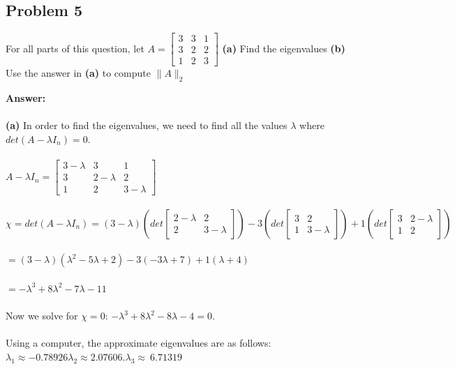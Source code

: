 \documentclass[12pt]{article}
\begin{document}
\newpage
\subsection*{Problem 5} For all parts of this question, let $A=\left[\begin{array}{lll}{3} & {3} & {1} \\ {3} & {2} & {2} \\ {1} & {2} & {3}\end{array}\right]$ \textbf{(a)} Find the eigenvalues \textbf{(b)} Use the answer in \textbf{(a)} to compute $\|A\|_2$

\bigskip
\noindent\textbf{Answer:}
\\~\\\textbf{(a)} In order to find the eigenvalues, we need to find all the values $\lambda$ where $det(A-\lambda I_n)=0$.
\\~\\$A-\lambda I_n=\left[\begin{array}{lll}{3-\lambda} & {3} & {1} \\ {3} & {2-\lambda} & {2} \\ {1} & {2} & {3-\lambda}\end{array}\right]$
\\~\\$\chi=det(A-\lambda I_n)=(3-\lambda)\left(det\left[\begin{array}{ll}{2-\lambda} & {2} \\ {2} & {3-\lambda}\end{array}\right]\right)-3\left(det\left[\begin{array}{ll}{3} & {2} \\ {1} & {3-\lambda}\end{array}\right]\right)+1\left(det\left[\begin{array}{ll}{3} & {2-\lambda} \\ {1} & {2}\end{array}\right]\right)$
\\~\\$=(3-\lambda)(\lambda^2-5\lambda +2)-3(-3\lambda +7)+1(\lambda +4)$
\\~\\$=-\lambda^3+8\lambda^2-7\lambda -11$
\\~\\Now we solve for $\chi=0$: $-\lambda^3+8\lambda^2-8\lambda-4=0$.
\\~\\Using a computer, the approximate eigenvalues are as follows: $\lambda_1\approx -0.78926\lambda_2\approx 2.07606. \lambda_3\approx\ 6.71319$
\end{document}
